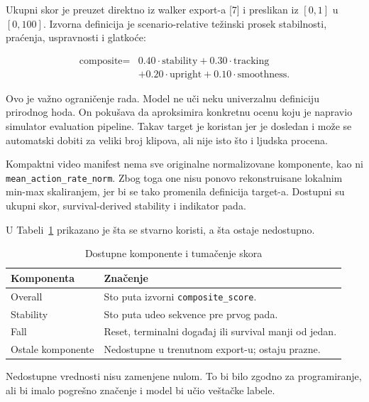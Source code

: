 \documentclass[12pt,a4paper]{report}
\begin{document}
Ukupni skor je preuzet direktno iz walker export-a [7] i preslikan iz $[0,1]$
u $[0,100]$. Izvorna definicija je scenario-relative težinski prosek
stabilnosti, praćenja, uspravnosti i glatkoće:

\begin{equation*}
\begin{aligned}
\text{composite} = {} & 0.40 \cdot \text{stability}
+ 0.30 \cdot \text{tracking} \\
& + 0.20 \cdot \text{upright}
+ 0.10 \cdot \text{smoothness}.
\end{aligned}
\end{equation*}

Ovo je važno ograničenje rada. Model ne uči neku univerzalnu definiciju
prirodnog hoda. On pokušava da aproksimira konkretnu ocenu koju je napravio
simulator evaluation pipeline. Takav target je koristan jer je dosledan i
može se automatski dobiti za veliki broj klipova, ali nije isto što i ljudska
procena.

Kompaktni video manifest nema sve originalne normalizovane komponente, kao ni
\texttt{mean\_action\_rate\_norm}. Zbog toga one nisu ponovo rekonstruisane
lokalnim min-max skaliranjem, jer bi se tako promenila definicija target-a.
Dostupni su ukupni skor, survival-derived stability i indikator pada.

U Tabeli~\ref{tab:score-components} prikazano je šta se stvarno koristi, a šta
ostaje nedostupno.

\begin{table}[H]
  \centering
  \caption{Dostupne komponente i tumačenje skora}
  \label{tab:score-components}
  \begin{tabular}{p{4.2cm}p{8.7cm}}
    \toprule
    Komponenta & Značenje \\
    \midrule
    Overall & Sto puta izvorni \texttt{composite\_score}. \\
    Stability & Sto puta udeo sekvence pre prvog pada. \\
    Fall & Reset, terminalni događaj ili survival manji od jedan. \\
    Ostale komponente & Nedostupne u trenutnom export-u; ostaju prazne. \\
    \bottomrule
  \end{tabular}
\end{table}

Nedostupne vrednosti nisu zamenjene nulom. To bi bilo zgodno za programiranje,
ali bi imalo pogrešno značenje i model bi učio veštačke labele.
\end{document}
